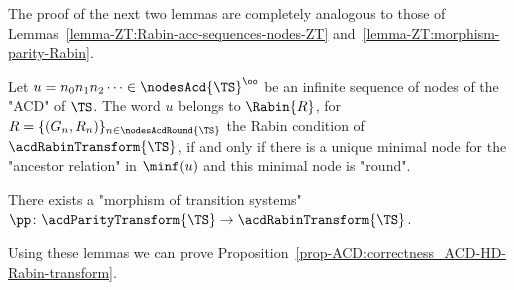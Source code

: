 \documentclass[10pt,a4paper]{amsart}
\begin{document}
The proof of the next two lemmas are completely analogous to those of Lemmas~\ref{lemma-ZT:Rabin-acc-sequences-nodes-ZT} and~\ref{lemma-ZT:morphism-parity-Rabin}.
\begin{lemma}\label{lemma-acd:Rabin-acc-sequences-nodes-ACD}
	Let $u = n_0n_1n_2\dots \in \nodesAcd{\TS}^\oo$ be an infinite sequence of nodes of the "ACD" of $\TS$. The word $u$ belongs to $\Rabin{R}$, for $R = \{(G_n,R_n)\}_{n\in\nodesAcdRound{\TS}}$ the Rabin condition of $\acdRabinTransform{\TS}$, if and only if there is a unique minimal node for the "ancestor relation" in $\minf(u)$ and this minimal node is "round".
\end{lemma}

\begin{lemma}\label{lemma-acd:morphism-Parity-Rabin}
	There exists a "morphism of transition systems" $\pp\colon \acdParityTransform{\TS} \to \acdRabinTransform{\TS}$.
\end{lemma}


Using these lemmas we can prove Proposition~\ref{prop-ACD:correctness_ACD-HD-Rabin-transform}.
\end{document}
